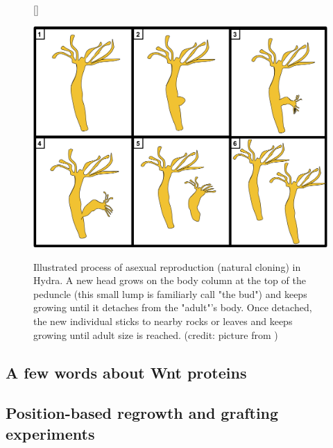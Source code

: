 \begin{figure}[h]
	[\FBwidth]
	{\caption{Illustrated process of asexual reproduction (natural cloning) in Hydra. A new head grows on the body column at the top of the peduncle (this small lump is familiarly call "the bud") and keeps growing until it detaches from the "adult"'s body. Once detached, the new individual sticks to nearby rocks or leaves and keeps growing until adult size is reached. (credit: picture from \cite{Neupane2022})}\label{fig:hydrareprod}}
	{\includegraphics[width=0.9\linewidth]{figures/hydra_asexual.png}}
\end{figure}


  

\subsection{A few words about Wnt proteins}


\subsection{Position-based regrowth and grafting experiments}